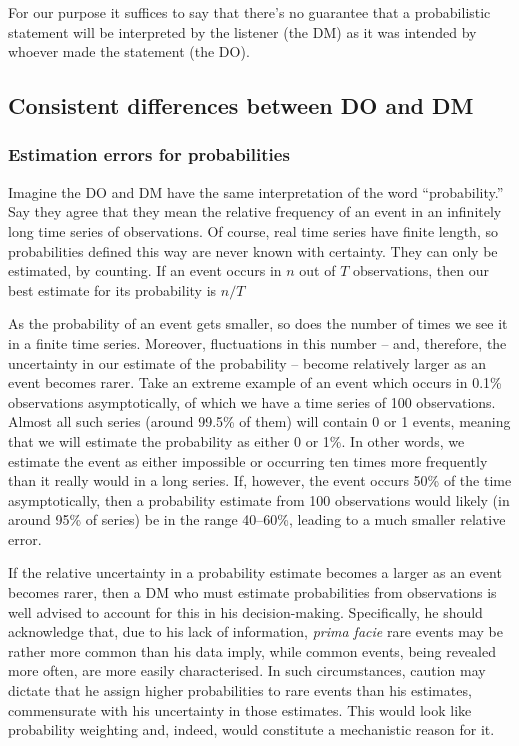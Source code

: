 \documentclass[a4paper, 12pt]{article}
\newcommand{\seclabel}[1]{\label{sec:#1}}
\begin{document}
For our purpose it suffices to say that there's no guarantee that a probabilistic statement will be interpreted by the listener (the DM) as it was intended by whoever made the statement (the DO).

\subsection{Consistent differences between DO and DM \seclabel{condition2}}

\subsubsection*{Estimation errors for probabilities}
Imagine the DO and DM have the same interpretation of the word ``probability.'' Say they agree that they mean the relative frequency of an event in an infinitely long time series of observations. Of course, real time series have finite length, so probabilities defined this way are never known with certainty. They can only be estimated, by counting. If an event occurs in $n$ out of $T$ observations, then our best estimate for its probability is $n/T$

As the probability of an event gets smaller, so does the number of times we see it in a finite time series. Moreover, fluctuations in this number -- and, therefore, the uncertainty in our estimate of the probability -- become relatively larger as an event becomes rarer. Take an extreme example of an event which occurs in 0.1\% observations asymptotically, of which we have a time series of 100 observations. Almost all such series (around 99.5\% of them) will contain 0 or 1 events, meaning that we will estimate the probability as either 0 or 1\%. In other words, we estimate the event as either impossible or occurring ten times more frequently than it really would in a long series. If, however, the event occurs 50\% of the time asymptotically, then a probability estimate from 100 observations would likely (in around 95\% of series) be in the range 40--60\%, leading to a much smaller relative error.

If the relative uncertainty in a probability estimate becomes a larger as an event becomes rarer, then a DM who must estimate probabilities from observations is well advised to account for this in his decision-making. Specifically, he should acknowledge that, due to his lack of information, {\it prima facie} rare events may be rather more common than his data imply, while common events, being revealed more often, are more easily characterised. In such circumstances, caution may dictate that he assign higher probabilities to rare events than his estimates, commensurate with his uncertainty in those estimates. This would look like probability weighting and, indeed, would constitute a mechanistic reason for it.
\end{document}
